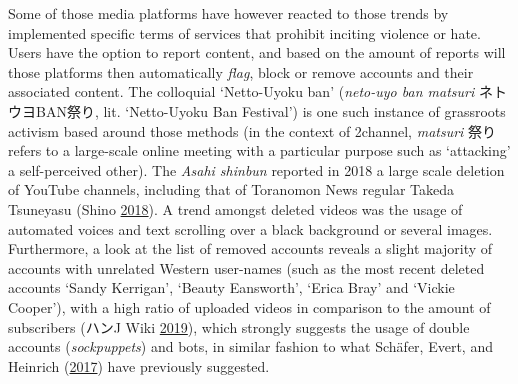 \documentclass[10pt,british,A4paper,oneside]{memoir}
\begin{document}
Some of those media platforms have however reacted to those trends by
implemented specific terms of services that prohibit inciting violence
or hate. Users have the option to report content, and based on the
amount of reports will those platforms then automatically \emph{flag},
block or remove accounts and their associated content. The colloquial
`Netto-Uyoku ban' (\emph{neto-uyo ban matsuri} ネトウヨBAN祭り, lit.
`Netto-Uyoku Ban Festival') is one such instance of grassroots activism
based around those methods (in the context of 2channel, \emph{matsuri}
祭り refers to a large-scale online meeting with a particular purpose
such as `attacking' a self-perceived other). The \emph{Asahi shinbun}
reported in 2018 a large scale deletion of YouTube channels, including
that of Toranomon News regular Takeda Tsuneyasu (Shino
\protect\hyperlink{ref-shino_eng:_2018}{2018}). A trend amongst deleted
videos was the usage of automated voices and text scrolling over a black
background or several images. Furthermore, a look at the list of removed
accounts reveals a slight majority of accounts with unrelated Western
user-names (such as the most recent deleted accounts `Sandy Kerrigan',
`Beauty Eansworth', `Erica Bray' and `Vickie Cooper'), with a high ratio
of uploaded videos in comparison to the amount of subscribers (ハンJ
Wiki \protect\hyperlink{ref-j_wiki_completed_2019}{2019}), which
strongly suggests the usage of double accounts (\emph{sockpuppets}) and
bots, in similar fashion to what Schäfer, Evert, and Heinrich
(\protect\hyperlink{ref-schafer_japans_2017}{2017}) have previously
suggested.
\end{document}
